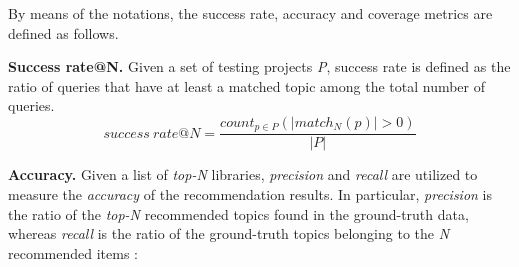 \noindent By means of the notations, the success rate, accuracy and coverage metrics are defined as follows.  


\vspace{.1cm}
\noindent\textbf{Success rate@N.} Given a set of testing projects \emph{P}, success rate is defined as the ratio of queries that have at least a matched topic among the total number of queries.%
\vspace{-.1cm}
\begin{equation} \label{eqn:RecallRate}
success\ rate@N=\frac{ count_{p \in P}( \left | match_{N}(p) \right | > 0 ) }{\left | P \right |} %
\end{equation}

\vspace{.1cm}
%
%
\noindent \textbf{Accuracy.} Given a list of \emph{top-N} libraries, \emph{precision} and \emph{recall} are utilized to measure the \emph{accuracy} of the recommendation results. In particular,  \emph{precision} is the ratio of the \emph{top-N} recommended topics found in the ground-truth data, whereas \emph{recall} is the ratio of the ground-truth topics belonging to the \emph{N} recommended items \cite{Davis:2006:RPR:1143844.1143874,Nguyen:2019:FRS:3339505.3339636}:

